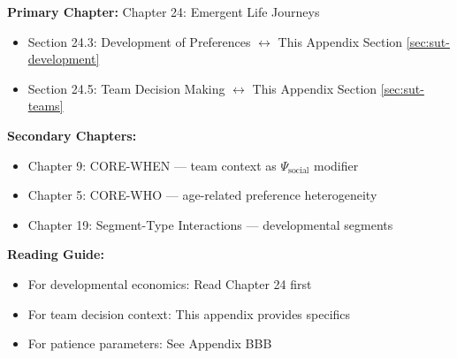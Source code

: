 %
%

%
%
%
%

\begin{tcolorbox}[colback=purple!5!white, colframe=purple!75!black,
    title=Chapter Linkage]

\textbf{Primary Chapter:} Chapter 24: Emergent Life Journeys
\begin{itemize}[nosep]
\item Section 24.3: Development of Preferences $\leftrightarrow$ This Appendix Section \ref{sec:sut-development}
\item Section 24.5: Team Decision Making $\leftrightarrow$ This Appendix Section \ref{sec:sut-teams}
\end{itemize}

\textbf{Secondary Chapters:}
\begin{itemize}[nosep]
\item Chapter 9: CORE-WHEN --- team context as $\Psi_{\text{social}}$ modifier
\item Chapter 5: CORE-WHO --- age-related preference heterogeneity
\item Chapter 19: Segment-Type Interactions --- developmental segments
\end{itemize}

\textbf{Reading Guide:}
\begin{itemize}[nosep]
\item For developmental economics: Read Chapter 24 first
\item For team decision context: This appendix provides specifics
\item For patience parameters: See Appendix BBB
\end{itemize}

\end{tcolorbox}


